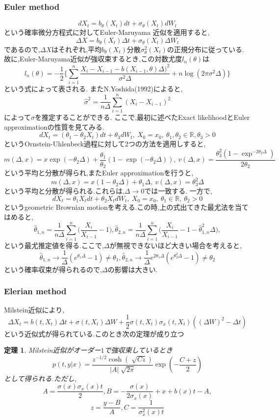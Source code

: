 \documentclass[a4paper,dvipdfmx]{jreport}
\numberwithin{equation}{section}
\newtheorem{Thm}     {定理}[section]
\renewenvironment{leftbar}{%
  \def\FrameCommand{\vrule width 1pt \hspace{10pt}}%
  \MakeFramed {\advance\hsize-\width \FrameRestore}}%
 {\endMakeFramed}
\def\R{\mathbb R}
\def\thm{\begin{leftbar}\begin{Thm}}
\def\thmx{\end{Thm}\end{leftbar}}
\begin{document}
\subsubsection{Euler method}
\[
dX_t = b_\theta (X_t) dt + \sigma_\theta(X_t) dW_t
\]
という確率微分方程式に対してEuler-Maruyama 近似を適用すると,
\[
\Delta X = b_\theta (X_t) \Delta t + \sigma_\theta(X_t) \Delta W_t
\]
であるので,$\Delta X$はそれぞれ,平均$b_\theta(X_t)$分散$ \sigma^2_\theta(X_t) $の正規分布に従っている.
故に,Euler-Maruyama近似が強収束するとき,この対数尤度$l_n(\theta)$は
\[
l_n(\theta) = -\frac{1}{2}
	 \biggl\{ \sum_{i=1}^n \frac{X_i - X_{i-1} -b(X_{i-1},\theta)\Delta)^2}{\sigma^2 \Delta} + n\log (2\pi \sigma^2 \Delta)
	 \biggl\}
\]
という式によって表される.
またN.Yoshida(1992)によると,
\[
\hat{\sigma}^2 = \frac{1}{n\Delta} \sum_{i=1}^n (X_i - X_{i-1})^2
\]
によって$\sigma$を推定することができる.
ここで,最初に述べたExact likelihoodとEuler approximationの性質を見てみる.
\[
dX_t = (\theta_1 - \theta_2 X_t )  dt + \theta_3 dW_t ,\  X_0=x_0, \ \theta_1,\theta_2\in \R,\theta_3>0
\]
というOrnstein-Uhlenbeck過程に対して2つの方法を適用しすると,
\[
m(\Delta,x) = x\exp(-\theta_2\Delta) + \frac{\theta_1}{\theta_2} (1- \exp(-\theta_2 \Delta)) , 
\ v(\Delta,x) = \frac{\theta_3^2(1-\exp^{-2\theta_2 \Delta})}{2\theta_2} 
\]
という平均と分散が得られ,またEuler approximationを行うと,
\[
m(\Delta,x) = x(1-\theta_2 \Delta) + \theta_1 \Delta , \ v(\Delta,x) = \theta_3^2 \Delta
\]
という平均と分散が得られる.これらは,$\Delta \to 0$では一致する.
一方で,
\[
dX_t = \theta_1 X_t dt + \theta_2 X_t dW_t , \ X_0 = x_0 ,\ \theta_1 \in \R,\ \theta_2 >0
\]
というgeometric Brownian motionを考える.この時,上の式出てきた最尤法を当てはめると,
\[
\hat{\theta}_{1,n} = \frac{1}{n\Delta} \sum_{i=1}^n \biggl( \frac{X_i}{X_{i-1}} -1 \biggl),
\hat{\theta}_{2,n} = \frac{1}{n\Delta} \sum_{i=1}^n \biggl( \frac{X_i}{X_{i-1}} -1  - \hat{\theta}_{1,n}^2 \Delta \biggl),
\]
という最尤推定値を得る.ここで,$\Delta$が無視できないほど大きい場合を考えると,
\[
\hat{\theta}_{1,n} \to \frac{1}{\Delta} (e^{\theta_1 \Delta} -1 ) \neq \theta_1,
\hat{\theta}_{2,n} \to \frac{1}{\Delta}e^{2 \theta_1 \Delta}  (e^{\theta_2^2 \Delta} -1 ) \neq \theta_2
\]
という確率収束が得られるので,$\Delta$の影響は大きい.

\subsubsection{Elerian method}
Milstein近似により,
\[
\Delta X_t = b(t,X_t)\Delta t + \sigma(t,X_t) \Delta W + \frac{1}{2} \sigma(t,X_t)\sigma_x(t,X_t)((\Delta W)^2 - \Delta t)
\]
という近似式が得られている.このとき次の定理が成り立つ
\thm
Milstein近似がオーダー$1$で強収束しているとき
\[
p(t,y|x) = \frac{z^{-1/2} \cosh (\sqrt[]{Cz}) }{|A|\sqrt[]{2\pi}} \exp(-\frac{C+z}{2})
\]
として得られる.ただし,
\[
A =\frac{\sigma(x)\sigma_x(x) t}{2} , B = -\frac{\sigma(x)}{2\sigma_x(x)}+x+b(x)t-A,
\]
\[
z = \frac{y-B}{A} , C = \frac{1}{\sigma^2_x(x) t}
\]
\thmx
\end{document}
